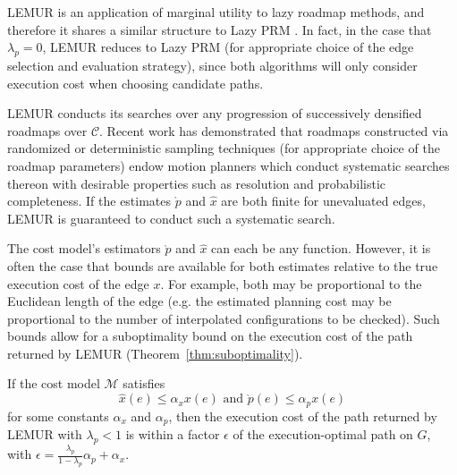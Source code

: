 LEMUR is an application of marginal utility to lazy roadmap methods,
and therefore it shares a similar structure
to Lazy PRM \citep{bohlin2000lazyprm}.
In fact, in the case that $\lambda_p=0$,
LEMUR reduces to Lazy PRM
(for appropriate choice of the edge selection and evaluation strategy),
since both algorithms will only consider execution cost when choosing
candidate paths.

LEMUR conducts its searches over any progression of
successively densified roadmaps over $\mathcal{C}$.
Recent work has demonstrated that roadmaps constructed via
randomized \citep{karaman2011samplingoptimal}
or deterministic \citep{janson2015deterministicsampling} sampling
techniques
(for appropriate choice of the roadmap parameters)
endow motion planners which conduct systematic searches thereon
with desirable properties such as resolution
and probabilistic completeness.
If the estimates $\grave{p}$ and $\hat{x}$
are both finite for unevaluated edges,
LEMUR is guaranteed to conduct such a systematic search.

The cost model's estimators $\grave{p}$ and $\hat{x}$ can each be any
function.
However,
it is often the case that bounds are available for both estimates
relative to the true execution cost of the edge $x$.
For example,
both may be proportional to the Euclidean length of the edge
(e.g. the estimated planning cost may be proportional to the number
of interpolated configurations to be checked).
Such bounds allow for a suboptimality bound on the execution cost
of the path returned by LEMUR
(Theorem~\ref{thm:suboptimality}).

\begin{theorem}
   \label{thm:suboptimality}
   If the cost model $\mathcal{M}$
   satisfies
   \begin{equation}
      \hat{x}(e) \leq \alpha_x x(e)
      \mbox{ and }
      \grave{p}(e) \leq \alpha_p x(e)
      \label{eqn:suboptimality-conditions}
   \end{equation}
   for some constants $\alpha_x$ and $\alpha_p$,
   then the execution cost of the path returned by LEMUR
   with $\lambda_p < 1$
   is within a factor $\epsilon$ of the
   execution-optimal path on $G$,
   with $\epsilon = \frac{\lambda_p}{1 - \lambda_p}\alpha_p + \alpha_x$.
\end{theorem}

